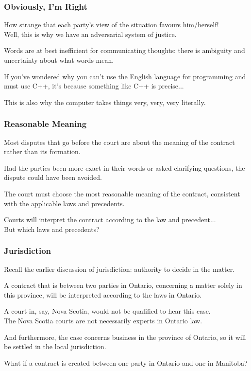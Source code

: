 \begin{frame}
\frametitle{Obviously, I'm Right}

How strange that each party's view of the situation favours him/herself!\\
\quad Well, this is why we have an adversarial system of justice.

Words are at best inefficient for communicating thoughts: there is ambiguity and uncertainty about what words mean.

If you've wondered why you can't use the English language for programming and must use C++, it's because something like C++ is precise...

This is also why the computer takes things very, very, very literally.

\end{frame}



\begin{frame}
\frametitle{Reasonable Meaning}


Most disputes that go before the court are about the meaning of the contract rather than its formation.

Had the parties been more exact in their words or asked clarifying questions, the dispute could have been avoided.

The court must choose the most reasonable meaning of the contract, consistent with the applicable laws and precedents.


Courts will interpret the contract according to the law and precedent...\\
\quad But which laws and precedents?

\end{frame}



\begin{frame}
\frametitle{Jurisdiction}

Recall the earlier discussion of jurisdiction: authority to decide in the matter.

A contract that is between two parties in Ontario, concerning a matter solely in this province, will be interpreted according to the laws in Ontario.

A court in, say, Nova Scotia, would not be qualified to hear this case.\\
\quad The Nova Scotia courts are not necessarily experts in Ontario law.

And furthermore, the case concerns business in the province of Ontario, so it will be settled in the local jurisdiction.

What if a contract is created between one party in Ontario and one in Manitoba?

\end{frame}



